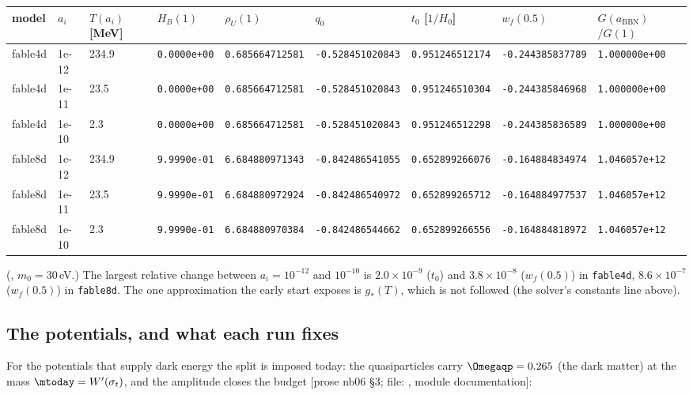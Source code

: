 {\scriptsize
\setlength{\tabcolsep}{2pt}
\begin{center}
\begin{tabular}{@{}lllllllll@{}}
\toprule
model & $a_i$ & \parbox[t]{0.9cm}{\raggedright$T(a_i)$\\ {}[MeV]} & $H_B(1)$ & $\rho_U(1)$ & $q_0$ & $t_0$ [$1/H_0$] & $w_f(0.5)$ & \parbox[t]{1.3cm}{\raggedright$G(a_{\mathrm{BBN}})$\\ ${}/G(1)$} \tabularnewline
\midrule
fable4d & 1e-12 & 234.9 & \texttt{0.0000e+00} & \texttt{0.685664712581} & \texttt{-0.528451020843} & \texttt{0.951246512174} & \texttt{-0.244385837789} & \texttt{1.000000e+00} \tabularnewline
fable4d & 1e-11 & 23.5 & \texttt{0.0000e+00} & \texttt{0.685664712581} & \texttt{-0.528451020843} & \texttt{0.951246510304} & \texttt{-0.244385846968} & \texttt{1.000000e+00} \tabularnewline
fable4d & 1e-10 & 2.3 & \texttt{0.0000e+00} & \texttt{0.685664712581} & \texttt{-0.528451020843} & \texttt{0.951246512298} & \texttt{-0.244385836589} & \texttt{1.000000e+00} \tabularnewline
fable8d & 1e-12 & 234.9 & \texttt{9.9990e-01} & \texttt{6.684880971343} & \texttt{-0.842486541055} & \texttt{0.652899266076} & \texttt{-0.164884834974} & \texttt{1.046057e+12} \tabularnewline
fable8d & 1e-11 & 23.5 & \texttt{9.9990e-01} & \texttt{6.684880972924} & \texttt{-0.842486540972} & \texttt{0.652899265712} & \texttt{-0.164884977537} & \texttt{1.046057e+12} \tabularnewline
fable8d & 1e-10 & 2.3 & \texttt{9.9990e-01} & \texttt{6.684880970384} & \texttt{-0.842486544662} & \texttt{0.652899266556} & \texttt{-0.164884818972} & \texttt{1.046057e+12} \tabularnewline
\bottomrule
\end{tabular}
\end{center}
}

\noindent(, $m_0=30$\,eV.) The largest relative change between $a_i=10^{-12}$ and
$10^{-10}$ is $2.0\times10^{-9}$ ($t_0$) and $3.8\times10^{-8}$ ($w_f(0.5)$) in \texttt{fable4d},
$8.6\times10^{-7}$ ($w_f(0.5)$) in \texttt{fable8d}. The one approximation the early start exposes is
$g_*(T)$, which is not followed (the solver's constants line above).

\subsection{The potentials, and what each run fixes}
\label{sec:9.3}

For the potentials that supply dark energy the split is imposed today: the quasiparticles carry
$\Omegaqp=0.265$ (the dark matter) at the mass $\mtoday=W'(\sigma_t)$, and the amplitude closes the budget
[prose nb06 \S3; file: , module documentation]:

